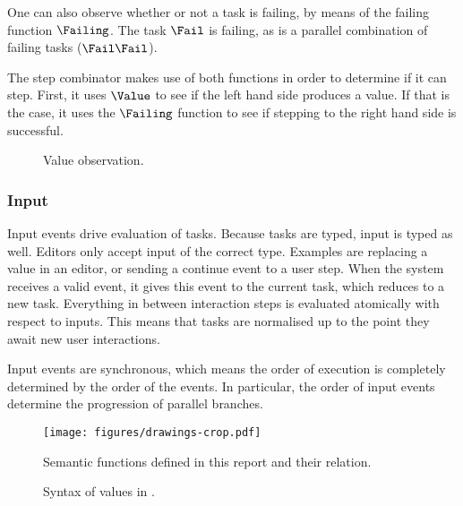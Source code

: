 One can also observe whether or not a task is failing, by means of the failing function $\Failing$.
The task $\Fail$ is failing, as is a parallel combination of failing tasks ($\Fail \And \Fail$).

The step combinator makes use of both functions in order to determine if it can step.
First, it uses $\Value$ to see if the left hand side produces a value.
If that is the case, it uses the $\Failing$ function to see if stepping to the right hand side is successful.

\begin{figure}[h]
  \centering \small
  \caption{
    Value observation.
  } \label{}
\end{figure}

\subsubsection{Input}

Input events drive evaluation of tasks.
Because tasks are typed, input is typed as well.
Editors only accept input of the correct type.
Examples are replacing a value in an editor,
or sending a continue event to a user step.
When the system receives a valid event, it gives this event to the current task, which reduces to a new task.
Everything in between interaction steps is evaluated atomically with respect to inputs.
This means that tasks are normalised up to the point they await new user interactions.

Input events are synchronous, which means the order of execution is completely determined by the order of the events.
In particular, the order of input events determine the progression of parallel branches.


\begin{figure}[h]
  \centering
  \texttt{[image: figures/drawings-crop.pdf]}
  \caption{
    Semantic functions defined in this report and their relation.
  }
  \label{fig:semantic-functions}
\end{figure}

\boxed{\RelationE}
\boxed{\RelationS}
\boxed{\RelationN}
\boxed{\RelationH}
\boxed{\RelationI}

\begin{figure}[ht]
  \centering \small
  \caption{Syntax of values in \TOPHAT.}
  \label{fig:syntaxvalues}
\end{figure}
